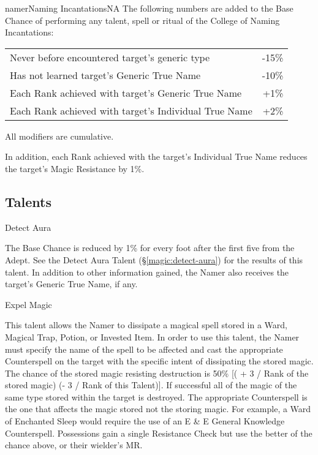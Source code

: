 \begin{college}[2.0]{namer}{Naming Incantations}{NA}
The following numbers are added to the Base Chance of performing any
talent, spell or ritual of the College of Naming Incantations:

\begin{tabularx}{\linewidth}{Xr}
Never before encountered target's generic type		& -15\% \\
Has not learned target's Generic True Name		& -10\% \\
Each Rank achieved with target's Generic True Name	& +1\% \\
Each Rank achieved with target's Individual True Name	& +2\% \\
\end{tabularx}

All modifiers are cumulative. 

In addition, each Rank achieved with the target's Individual True Name
reduces the target's Magic Resistance by 1\%.

\subsection{Talents}

\begin{talent}[T-1]{Detect Aura}
\begin{effects}
The Base Chance is reduced by 1\% for every foot after the first five
from the Adept. See the Detect Aura Talent (\S\ref{magic:detect-aura})
for the results of this talent. In addition to other information
gained, the Namer also receives the target's Generic True Name, if
any.
\end{effects}
\end{talent}

\begin{talent}[T-2]{Expel Magic}

\begin{effects}
This talent allows the Namer to dissipate a magical spell stored in a
Ward, Magical Trap, Potion, or Invested Item. In order to use this
talent, the Namer must specify the name of the spell to be affected
and cast the appropriate Counterspell on the target with the specific
intent of dissipating the stored magic. The chance of the stored magic
resisting destruction is 50\% [( + 3 / Rank of the stored magic) (- 3
/ Rank of this Talent)]. If successful all of the magic of the same
type stored within the target is destroyed. The appropriate
Counterspell is the one that affects the magic stored not the storing
magic. For example, a Ward of Enchanted Sleep would require the use of
an E \& E General Knowledge Counterspell. Possessions gain a single
Resistance Check but use the better of the chance above, or their
wielder's MR.
\end{effects}
\end{talent}


\end{college}
